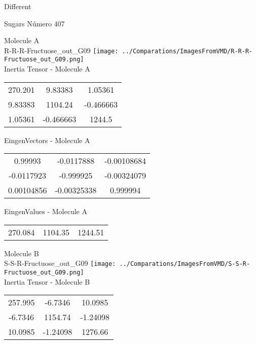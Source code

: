 \begin{center}
\vtab
\vtab
\textcolor{NavyBlue}{\Large Different}
\end{center}

 \newpage

\vtab[-2cm]
\begin{center}
{\large Sugars \tab Número 407}
\end{center}
\begin{multicols}{2}
\begin{center}

Molecule A \\ 
R-R-R-Fructuose\_out\_G09
\texttt{[image: ../Comparations/ImagesFromVMD/R-R-R-Fructuose\_out\_G09.png]}
\\
Inertia Tensor - Molecule A \\
\vtab

\begin{tabular}{|c c c|}
270.201	 & 	9.83383	 & 	1.05361	 \\
9.83383	 & 	1104.24	 & 	-0.466663	 \\
1.05361	 & 	-0.466663	 & 	1244.5
\end{tabular}

\vtab
 EingenVectors - Molecule A     \\
\vtab
\begin{tabular}{|c c c|}
0.99993	 & 	-0.0117888	 & 	-0.00108684	 \\
-0.0117923	 & 	-0.999925	 & 	-0.00324079	 \\
0.00104856	 & 	-0.00325338	 & 	0.999994
\end{tabular}

\vtab
 EingenValues - Molecule A     \\
\vtab
\begin{tabular}{|c c c|}
270.084	 & 	1104.35	 & 	1244.51	 \\
\end{tabular}
\columnbreak

Molecule B \\ 
S-S-R-Fructuose\_out\_G09
\texttt{[image: ../Comparations/ImagesFromVMD/S-S-R-Fructuose\_out\_G09.png]}
\\
Inertia Tensor - Molecule B \\
\vtab

\begin{tabular}{|c c c|}
257.995	 & 	-6.7346	 & 	10.0985	 \\
-6.7346	 & 	1154.74	 & 	-1.24098	 \\
10.0985	 & 	-1.24098	 & 	1276.66
\end{tabular}


\end{center}
\end{multicols}
